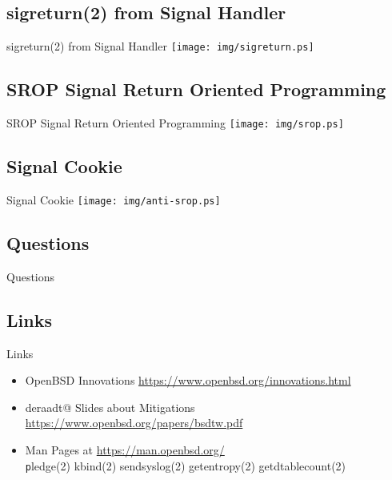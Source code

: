 \documentclass[14pt]{beamer}
\begin{document}
\subsection{sigreturn(2) from Signal Handler}
\begin{frame}{sigreturn(2) from Signal Handler}
\texttt{[image: img/sigreturn.ps]}
\end{frame}

\subsection{SROP Signal Return Oriented Programming}
\begin{frame}{SROP Signal Return Oriented Programming}
\texttt{[image: img/srop.ps]}
\end{frame}

\subsection{Signal Cookie}
\begin{frame}{Signal Cookie}
\texttt{[image: img/anti-srop.ps]}
\end{frame}

\subsection{Questions}
\begin{frame}{Questions}
\begin{center}
\end{center}
\end{frame}

\subsection{Links}
\begin{frame}{Links}
\begin{itemize}
    \item OpenBSD Innovations
	{\small \url{https://www.openbsd.org/innovations.html}}
    \item deraadt@ Slides about Mitigations
	{\small \url{https://www.openbsd.org/papers/bsdtw.pdf}}
    \item Man Pages at {\small \url{https://man.openbsd.org/}}\\
	\texttt
	pledge(2)
	kbind(2) 
	sendsyslog(2)
	getentropy(2)
	getdtablecount(2)
	
\end{itemize}
\end{frame}
\end{document}

